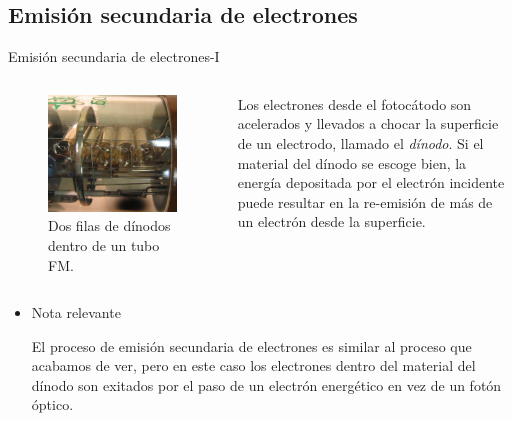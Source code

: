 \documentclass[a4paper,10pt]{beamer}
\begin{document}
\subsection{Emisión secundaria de electrones}
\begin{frame}{Emisión secundaria de electrones-I}


\begin{columns}[c]

 \column{2in}
\begin{figure}
   \includegraphics[scale=0.32]{fig7}
   \caption{Dos filas de dínodos dentro de un tubo FM.}
  \end{figure}
  
  \column{2.3in}
\begin{justify}
  Los electrones desde el fotocátodo son acelerados y llevados a chocar la superficie 
  de un electrodo, llamado el \emph{dínodo}. Si el material del dínodo se escoge bien,
  la energía depositada por el electrón incidente puede resultar en la re-emisión de 
  más de un electrón desde la superficie.
 \end{justify}

 \end{columns}

\begin{itemize}[<+->]

 \item[]  \begin{block}{Nota relevante}
  \begin{justify}
  \begin{footnotesize}
   El proceso de emisión secundaria de electrones es similar al proceso que acabamos 
   de ver, pero en este caso los electrones dentro del material del dínodo son 
   exitados por el paso de un electrón energético en vez de un fotón óptico.
   \end{footnotesize}
  \end{justify}
 \end{block}

\end{itemize}
\end{frame}
\end{document}
